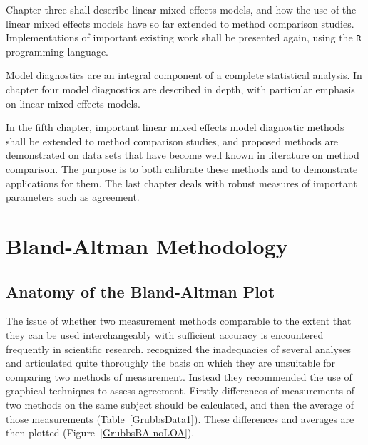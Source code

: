 \documentclass[12pt, a4paper]{report}
\theoremstyle{plain}
\theoremstyle{definition}
\theoremstyle{remark}
\begin{document}
		
	Chapter three shall describe linear mixed effects models, and how the use of the linear mixed effects models have so far extended to method comparison studies. Implementations of important existing work shall be presented again, using the \texttt{R} programming language.
	
	Model diagnostics are an integral component of a complete statistical analysis.
	In chapter four model diagnostics are described in depth, with particular
	emphasis on linear mixed effects models.
	
	In the fifth chapter, important linear mixed effects model diagnostic methods shall be extended to method comparison studies, and proposed methods are demonstrated on data sets that have become well known in literature on method comparison. The purpose is to both calibrate these methods and to demonstrate applications for them.
	The last chapter deals with robust measures of important parameters such as agreement.
	\chapter{Bland-Altman Methodology}
	\section{Anatomy of the Bland-Altman Plot}
	
	The issue of whether two measurement methods comparable to the 	extent that they can be used interchangeably with sufficient accuracy is encountered frequently in scientific research. \citet{BA83} recognized the inadequacies of several analyses and articulated quite thoroughly the basis on which they are unsuitable for comparing two methods of measurement. Instead they recommended the use of graphical techniques to assess agreement. Firstly differences of measurements of two methods on the same subject should  be calculated, and then the average of those measurements
	(Table~\ref{GrubbsData1}). These differences and averages are then plotted (Figure~\ref{GrubbsBA-noLOA}).
	
	
	
\end{document}
